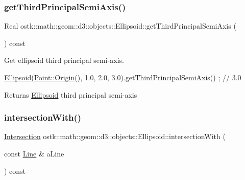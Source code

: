 \subsubsection{\texorpdfstring{get\+Third\+Principal\+Semi\+Axis()}{getThirdPrincipalSemiAxis()}}
{\footnotesize\ttfamily Real ostk\+::math\+::geom\+::d3\+::objects\+::\+Ellipsoid\+::get\+Third\+Principal\+Semi\+Axis (\begin{DoxyParamCaption}{ }\end{DoxyParamCaption}) const}



Get ellipsoid third principal semi-\/axis. 


\begin{DoxyCode}
\hyperlink{classostk_1_1math_1_1geom_1_1d3_1_1objects_1_1_ellipsoid_a106c71abf9503f3d06b2613c1c7e9d65}{Ellipsoid}(\hyperlink{classostk_1_1math_1_1geom_1_1d3_1_1objects_1_1_point_a079c199f08b015d456d02728a71b534c}{Point::Origin}(), 1.0, 2.0, 3.0).getThirdPrincipalSemiAxis() ; \textcolor{comment}{// 3.0}
\end{DoxyCode}


\begin{DoxyReturn}{Returns}
\hyperlink{classostk_1_1math_1_1geom_1_1d3_1_1objects_1_1_ellipsoid}{Ellipsoid} third principal semi-\/axis 
\end{DoxyReturn}
\mbox{\label{classostk_1_1math_1_1geom_1_1d3_1_1objects_1_1_ellipsoid_a18e2c5add63d0f1ed857a3cda95ceb10}} 
\subsubsection{\texorpdfstring{intersection\+With()}{intersectionWith()}\hspace{0.1cm}{\footnotesize\ttfamily [1/5]}}
{\footnotesize\ttfamily \hyperlink{classostk_1_1math_1_1geom_1_1d3_1_1_intersection}{Intersection} ostk\+::math\+::geom\+::d3\+::objects\+::\+Ellipsoid\+::intersection\+With (\begin{DoxyParamCaption}\item[{const \hyperlink{classostk_1_1math_1_1geom_1_1d3_1_1objects_1_1_line}{Line} \&}]{a\+Line }\end{DoxyParamCaption}) const}



